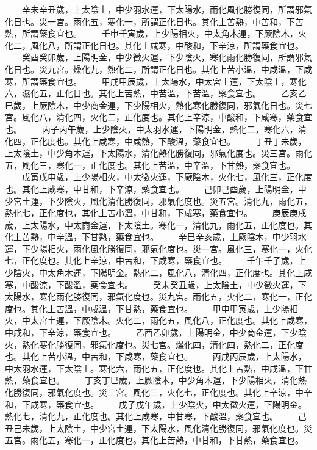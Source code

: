　　辛未辛丑歲，上太陰土，中少羽水運，下太陽水，雨化風化勝復同，所謂邪氣化日也。災一宮。雨化五，寒化一，所謂正化日也。其化上苦熱，中苦和，下苦熱，所謂藥食宜也。
　　壬申壬寅歲，上少陽相火，中太角木運，下厥陰木，火化二，風化八，所謂正化日也。其化土咸寒，中酸和，下辛涼，所謂藥食宜也。
　　癸酉癸卯歲，上陽明金，中少徵火運，下少陰火，寒化雨化勝復同，所謂邪氣化日也。災九宮。燥化九，熱化二，所謂正化日也。其化上苦小溫，中咸溫，下咸寒，所謂藥食宜也。
　　甲戌甲辰歲，上太陽水，中太宮土運，下太陰土，寒化六，濕化五，正化日也。其化上苦熱，中苦溫，下苦溫，藥食宜也。
　　乙亥乙巳歲，上厥陰木，中少商金運，下少陽相火，熱化寒化勝復同，邪氣化日也。災七宮。風化八，清化四，火化二，正化度也。其化上辛涼，中酸和，下咸寒，藥食宜也。
　　丙子丙午歲，上少陰火，中太羽水運，下陽明金，熱化二，寒化六，清化四，正化度也。其化上咸寒，中咸熱，下酸溫，藥食宜也。
　　丁丑丁未歲，上太陰土，中少角木運，下太陽水，清化熱化勝復同，邪氣化度也。災三宮。雨化五，風化三，寒化一，正化度也。其化上苦溫，中辛溫，下甘熱，藥食宜也。
　　戊寅戊申歲，上少陽相火，中太徵火運，下厥陰木，火化七，風化三，正化度也。其化上咸寒，中甘和，下辛涼，藥食宜也。
　　己卯己酉歲，上陽明金，中少宮土運，下少陰火，風化清化勝復同，邪氣化度也。災五宮。清化九，雨化五，熱化七，正化度也，其化上苦小溫，中甘和，下咸寒，藥食宜也。
　　庚辰庚戌歲，上太陽水，中太商金運，下太陰土。寒化一，清化九，雨化五，正化度也。其化上苦熱，中辛溫，下甘熱，藥食宜也。
　　辛巳辛亥歲，上厥陰木，中少羽水運，下少陽相火，雨化風化勝復同，邪氣化度也。災一宮。風化三，寒化一，火化七，正化度也。其化上辛涼，中苦和，下咸寒，藥食宜也。
　　壬午壬子歲，上少陰火，中太角木運，下陽明金。熱化二，風化八，清化四，正化度也。其化上咸寒，中酸涼，下酸溫，藥食宜也。
　　癸未癸丑歲，上太陰土，中少徵火運，下太陽水，寒化雨化勝復同，邪氣化度也。災九宮。雨化五，火化二，寒化一，正化度也。其化上苦溫，中咸溫，下甘熱，藥食宜也。
　　甲申甲寅歲，上少陽相火，中太宮土運，下厥陰木。火化二，雨化五，風化八，正化度也。其化上咸寒，中咸和，下辛涼，藥食宜也。
　　乙酉乙卯歲，上陽明金，中少商金運，下少陰火，熱化寒化勝復同，邪氣化度也。災七宮。燥化四，清化四，熱化二，正化度也。其化上苦小溫，中苦和，下咸寒，藥食宜也。
　　丙戌丙辰歲，上太陽水，中太羽水運，下太陰土。寒化六，雨化五，正化度也。其化上苦熱，中咸溫，下甘熱，藥食宜也。
　　丁亥丁巳歲，上厥陰木，中少角木運，下少陽相火，清化熱化勝復同，邪氣化度也。災三宮。風化三，火化七，正化度也。其化上辛涼，中辛和，下咸寒，藥食宜也。
　　戊子戊午歲，上少陰火，中太徵火運，下陽明金。熱化七，清化九，正化度也。其化上咸寒，中甘寒，下酸溫，藥食宜也。
　　己丑己未歲，上太陰土，中少宮土運，下太陽水，風化清化勝復同，邪氣化度也。災五宮。雨化五，寒化一，正化度也。其化上苦熱，中甘和，下甘熱，藥食宜也。
